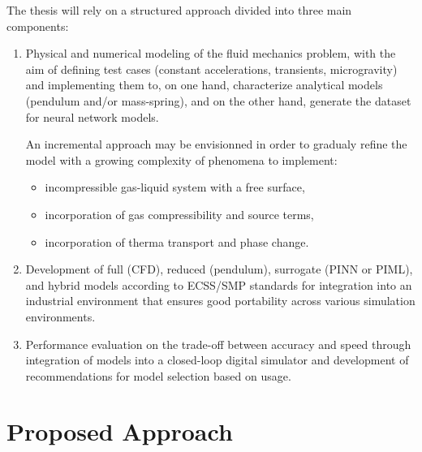 \documentclass[12pt]{article}
\begin{document}
	The thesis will rely on a structured approach divided into three main components:
	\begin{enumerate}
		\item Physical and numerical modeling of the fluid mechanics problem, with the aim of defining test cases (constant accelerations, transients, microgravity) and implementing them to, on one hand, characterize analytical models (pendulum and/or mass-spring), and on the other hand, generate the dataset for neural network models.
		
		An incremental approach may be envisionned in order to gradualy refine the model with a growing complexity of phenomena to implement:
		\begin{itemize}
			\item incompressible gas-liquid system with a free surface,
			\item incorporation of gas compressibility and source terms,
			\item incorporation of therma transport and phase change.
		\end{itemize}
		
		\item Development of full (CFD), reduced (pendulum), surrogate (PINN or PIML), and hybrid models according to ECSS/SMP standards for integration into an industrial environment that ensures good portability across various simulation environments.
		
		\item Performance evaluation on the trade-off between accuracy and speed through integration of models into a closed-loop digital simulator and development of recommendations for model selection based on usage.
	\end{enumerate}
	
	\section*{Proposed Approach}
	
\end{document}

